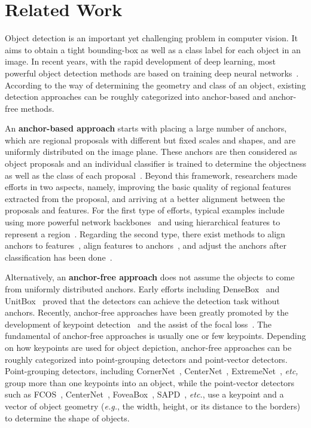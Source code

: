 \documentclass[runningheads]{llncs}
\begin{document}
\section{Related Work}\label{Related_Work}
\vspace{-0.5ex}

Object detection is an important yet challenging problem in computer vision. It aims to obtain a tight bounding-box as well as a class label for each object in an image. In recent years, with the rapid development of deep learning, most powerful object detection methods are based on training deep neural networks~\cite{girshick2014rich,girshick2015fast}. According to the way of determining the geometry and class of an object, existing detection approaches can be roughly categorized into anchor-based and anchor-free methods.

An \textbf{anchor-based approach} starts with placing a large number of anchors, which are regional proposals with different but fixed scales and shapes, and are uniformly distributed on the image plane. These anchors are then considered as object proposals and an individual classifier is trained to determine the objectness as well as the class of each proposal~\cite{ren2015faster}. Beyond this framework, researchers made efforts in two aspects, namely, improving the basic quality of regional features extracted from the proposal, and arriving at a better alignment between the proposals and features. For the first type of efforts, typical examples include using more powerful network backbones~\cite{he2016deep,sun2019deep,huang2017densely} and using hierarchical features to represent a region~\cite{lin2017feature,ren2015faster,liu2016ssd}. Regarding the second type, there exist methods to align anchors to features~\cite{zhang2018single,zhang2019freeanchor}, align features to anchors~\cite{dai2017deformable,chen2019revisiting}, and adjust the anchors after classification has been done~\cite{ren2015faster,liu2016ssd,cai2018cascade}.

Alternatively, an \textbf{anchor-free approach} does not assume the objects to come from uniformly distributed anchors. Early efforts including DenseBox~\cite{huang2015densebox} and UnitBox~\cite{yu2016unitbox} proved that the detectors can achieve the detection task without anchors. Recently, anchor-free approaches have been greatly promoted by the development of keypoint detection~\cite{newell2017associative} and the assist of the focal loss~\cite{lin2017focal}. The fundamental of anchor-free approaches is usually one or few keypoints. Depending on how keypoints are used for object depiction, anchor-free approaches can be roughly categorized into point-grouping detectors and point-vector detectors. Point-grouping detectors, including CornerNet~\cite{law2018cornernet}, CenterNet~\cite{duan2019centernet}, ExtremeNet~\cite{zhou2019bottom}, \textit{etc,} group more than one keypoints into an object, while the point-vector detectors such as FCOS~\cite{tian2019fcos}, CenterNet~\cite{zhou2019objects}, FoveaBox~\cite{kong2020foveabox}, SAPD~\cite{zhu2019soft}, \textit{etc.}, use a keypoint and a vector of object geometry (\textit{e.g.}, the width, height, or its distance to the borders) to determine the shape of objects.
\end{document}
